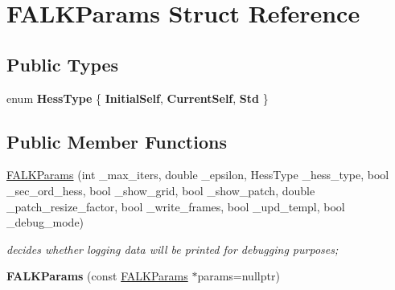 \hypertarget{structFALKParams}{\section{F\-A\-L\-K\-Params Struct Reference}
\label{structFALKParams}
}
\subsection*{Public Types}
\begin{DoxyCompactItemize}
\item 
enum {\bfseries Hess\-Type} \{ {\bfseries Initial\-Self}, 
{\bfseries Current\-Self}, 
{\bfseries Std}
 \}
\end{DoxyCompactItemize}
\subsection*{Public Member Functions}
\begin{DoxyCompactItemize}
\item 
\hyperlink{structFALKParams_a5478ddf0e62e74d539aa39fca02f79b0}{F\-A\-L\-K\-Params} (int \-\_\-max\-\_\-iters, double \-\_\-epsilon, Hess\-Type \-\_\-hess\-\_\-type, bool \-\_\-sec\-\_\-ord\-\_\-hess, bool \-\_\-show\-\_\-grid, bool \-\_\-show\-\_\-patch, double \-\_\-patch\-\_\-resize\-\_\-factor, bool \-\_\-write\-\_\-frames, bool \-\_\-upd\-\_\-templ, bool \-\_\-debug\-\_\-mode)
\begin{DoxyCompactList}\small\item\em decides whether logging data will be printed for debugging purposes; \end{DoxyCompactList}\item 
\hypertarget{structFALKParams_a45cf22a7c4e26dc85306879d348429cd}{{\bfseries F\-A\-L\-K\-Params} (const \hyperlink{structFALKParams}{F\-A\-L\-K\-Params} $\ast$params=nullptr)}\label{structFALKParams_a45cf22a7c4e26dc85306879d348429cd}

\end{DoxyCompactItemize}
